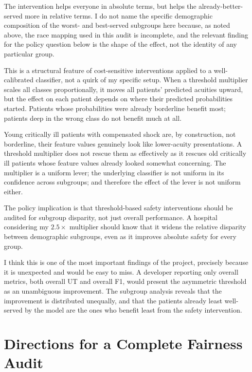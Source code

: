 The intervention helps everyone in absolute terms, but helps the already-better-served more in relative terms. I do not name the specific demographic composition of the worst- and best-served subgroups here because, as noted above, the race mapping used in this audit is incomplete, and the relevant finding for the policy question below is the shape of the effect, not the identity of any particular group.

\begin{remarkbox}
This is a structural feature of cost-sensitive interventions applied to a well-calibrated classifier, not a quirk of my specific setup. When a threshold multiplier scales all classes proportionally, it moves all patients' predicted acuities upward, but the effect on each patient depends on where their predicted probabilities started. Patients whose probabilities were already borderline benefit most; patients deep in the wrong class do not benefit much at all.

Young critically ill patients with compensated shock are, by construction, not borderline, their feature values genuinely look like lower-acuity presentations. A threshold multiplier does not rescue them as effectively as it rescues old critically ill patients whose feature values already looked somewhat concerning. The multiplier is a uniform lever; the underlying classifier is not uniform in its confidence across subgroups; and therefore the effect of the lever is not uniform either.

The policy implication is that threshold-based safety interventions should be audited for subgroup disparity, not just overall performance. A hospital considering my $2.5\times$ multiplier should know that it widens the relative disparity between demographic subgroups, even as it improves absolute safety for every group.
\end{remarkbox}

I think this is one of the most important findings of the project, precisely because it is unexpected and would be easy to miss. A developer reporting only overall metrics, both overall UT and overall F1, would present the asymmetric threshold as an unambiguous improvement. The subgroup analysis reveals that the improvement is distributed unequally, and that the patients already least well-served by the model are the ones who benefit least from the safety intervention.

\section{Directions for a Complete Fairness Audit}


